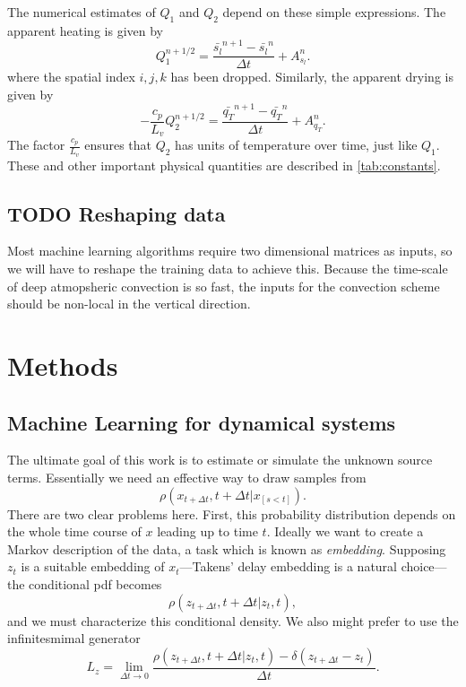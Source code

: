 \documentclass{report}
\begin{document}
The numerical estimates of $Q_1$ and $Q_2$ depend on these simple expressions.
The apparent heating is given by
\begin{equation}
  \label{eq:q1-num}
  Q_1^{n+1/2} = \frac{\bar{s_l}^{n+1} - \bar{s_l}^{n} }{\Delta t}
            +  A^{n}_{s_l} .
\end{equation}
where the spatial index $i,j,k$ has been dropped. Similarly, the apparent
drying is given by
\begin{equation}
  \label{eq:q2-num}
  -\frac{c_p}{L_v} Q_2^{n+1/2} = \frac{\bar{q_T}^{n+1} - \bar{q_T}^{n} }{\Delta t}
            +  A^{n}_{q_T} .
\end{equation}
The factor $\frac{c_p}{L_v}$ ensures that $Q_2$ has units of temperature over
time, just like $Q_1$. These and other important physical quantities are
described in \autoref{tab:constants}.

\section{TODO Reshaping data}

Most machine learning algorithms require two dimensional matrices as inputs, so
we will have to reshape the training data to achieve this. Because the
time-scale of deep atmopsheric convection is so fast, the inputs for the
convection scheme should be non-local in the vertical direction.

\chapter{Methods}

\section{Machine Learning for dynamical systems}

The ultimate goal of this work is to estimate or simulate the unknown source
terms. Essentially we need an effective way to draw samples
from
\[ \rho(x_{t+\Delta t}, t + \Delta t |x_{[s < t]}).\] There are two clear problems here. 
First, this probability distribution depends on the whole time course of
$x$ leading up to time $t$. 
Ideally we want to create a Markov description of the data, a task which is
known as \emph{embedding}. 
Supposing $z_t$ is a suitable embedding of $x_t$---Takens' delay embedding is a natural choice---the conditional pdf becomes
\[\rho(z_{t+\Delta t}, t+ \Delta t| z_t, t),\]
and we must characterize this conditional density.
We also might prefer to use the infinitesmimal generator
\[L_z = \lim_{\Delta t \rightarrow 0} \frac{\rho(z_{t+\Delta t}, t+ \Delta t| z_t,
    t) - \delta(z_{t+\Delta t} - z_t) }{\Delta t}.\]
\end{document}
